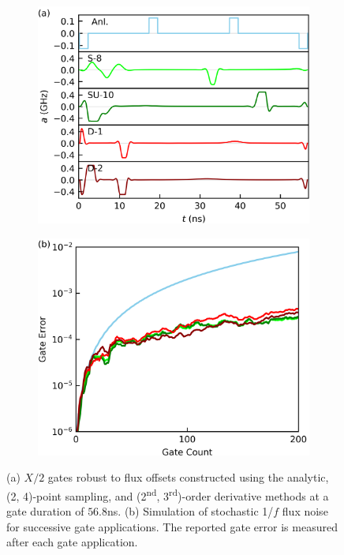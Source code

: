 \documentclass[
  amsfonts,
  amsmath,
  tbtags,
  amssymb,
  aps,
  nobibnotes,
  twocolumn,
  superscriptaddress,
]{revtex4-2}
\begin{document}
\begin{figure}[h]
  \begin{subfigure}{\linewidth}
    \includegraphics[width=\linewidth]{assets/f3a.png}
  \end{subfigure}
  
  \begin{subfigure}{\linewidth}
    \includegraphics[width=\linewidth]{assets/f3b.png}
  \end{subfigure}

  \caption{
    (a) $X/2$ gates robust to flux offsets constructed using the analytic,
    (2, 4)-point sampling, and (2\textsuperscript{nd}, 3\textsuperscript{rd})-order
    derivative methods at a gate duration
    of $56.8$ns. (b) Simulation of stochastic 1/$f$ flux noise for
    successive gate applications. The reported gate error is measured
    after each gate application.
  }
\end{figure}
\end{document}
